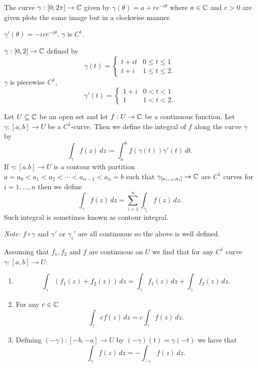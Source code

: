 \documentclass[10pt, a4paper]{article}
\begin{document}
\begin{example}
    The curve $\gamma : [0, 2\pi] \to \mathbb{C}$ given by $\gamma(\theta) = a + re ^ {-i\theta}$ where $a \in \mathbb{C}$ and $r > 0$ are given plots the same image but in a clockwise manner.

    $\gamma'(\theta) = -ire ^ {-i\theta}$.
    $\gamma$ is $C ^ 1$.
\end{example}

\begin{example}
    $\gamma : [0, 2] \to \mathbb{C}$ defined by
    \[
    \gamma(t) = \begin{cases}
        t + it & 0 \leq t \leq 1 \\
        t + i & 1 \leq t \leq 2.
    \end{cases}
    \]
    $\gamma$ is piecewise $C ^ 1$,
    \[
    \gamma'(t) = \begin{cases}
        1 + i & 0 < t < 1 \\
        1 & 1 < t < 2.
    \end{cases}
    \]
\end{example}

\begin{definition}
    Let $U \subseteq \mathbb{C}$ be an open set and let $f : U \to \mathbb{C}$ be a continuous function.
    Let $\gamma : [a, b] \to U$ be a $C ^ 1$-curve.
    Then we define the integral of $f$ along the curve $\gamma$ by
    \[
    \int_{\gamma}f(z)\,dz \coloneqq \int_{a}^{b}f(\gamma(t))\gamma'(t)\,dt.
    \]
    If $\gamma : [a. b] \to U$ is a contour with partition $a = a_0 < a_1 < a_2 < \dotsi < a_{n - 1} < a_n = b$ such that $\gamma_{[a_{i - 1}, a_i]} \to \mathbb{C}$ are $C ^ 1$ curves for $i = 1, \dotsc, n$ then we define
    \[
    \int_{\gamma}f(z)\,dz = \sum_{i = 1}^{n}\int_{\gamma_i}f(z)\,dz.
    \]
    Such integral is sometimes known as contour integral.
\end{definition}

\textit{Note:}
$f\circ \gamma$ and $\gamma'$ or $\gamma_i'$ are all continuous so the above is well defined.

\begin{lemma}
    Assuming that $f_1, f_2$ and $f$ are continuous on $U$ we find that for any $C ^ 1$ curve $\gamma : [a, b] \to U$:

    \begin{enumerate}[label = (\roman*)]
        \item
        \[
        \int_{\gamma}(f_1(z) + f_2(z))\,dz = \int_{\gamma}f_1(z)\,dz + \int_{\gamma}f_2(z)\,dz.
        \]

        \item For any $c \in \mathbb{C}$
        \[
        \int_{\gamma}cf(z)\,dz = c\int_{\gamma}f(z)\,dz.
        \]

        \item Defining $(-\gamma) : [-b, -a] \to U$ by $(-\gamma)(t) = \gamma(-t)$ we have that
        \[
        \int_{\gamma}f(z)\,dz = -\int_{-\gamma}f(z)\,dz.
        \]
    \end{enumerate}
\end{lemma}
\end{document}
